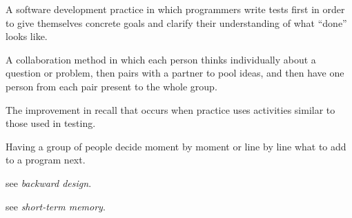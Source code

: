 \begin{description}
 A
software development practice in which programmers write tests first
in order to give themselves concrete goals and clarify their
understanding of what ``done'' looks like.

 A collaboration method
in which each person thinks individually about a question or problem,
then pairs with a partner to pool ideas, and then have one person from
each pair present to the whole group.

 The improvement in recall that occurs when practice uses
activities similar to those used in testing.

 Having a group of people
decide moment by moment or line by line what to add to a program next.


see \emph{backward design}.



see \emph{short-term memory}.




\end{description}
